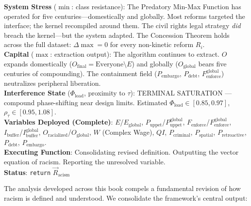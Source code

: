 \begin{tcolorbox}[colback=black!5, colframe=black!70, fonttitle=\bfseries\ttfamily, title=RUNTIME LOG: FINAL OUTPUT]
\ttfamily\small
\textbf{System Stress} ($\min$: class resistance): The Predatory Min-Max Function has operated for five centuries---domestically and globally. Most reforms targeted the interface; the kernel recompiled around them. The civil rights legal strategy \textit{did} breach the kernel---but the system adapted. The Concession Theorem holds across the full dataset: $\Delta\max = 0$ for every non-kinetic reform $R_i$.\\
\textbf{Capital} ($\max$: extraction output): The algorithm continues to extract. $O$ expands domestically ($O_{\text{final}} = \text{Everyone} \setminus E$) and globally ($O_{\text{global}}$ bears five centuries of compounding). The containment field ($P_{\text{embargo}}${,} $P_{\text{debt}}${,} $F_{\text{enforce}}^{\text{global}}$) neutralizes peripheral liberation.\\
\textbf{Interference State} ($\Phi_{\text{load}}$, proximity to $\tau$): TERMINAL SATURATION --- compound phase-shifting near design limits. Estimated $\Phi_{\text{load}} \in [0.85, 0.97]$, $\rho_{\tau} \in [0.95, 1.08]$.\\
\textbf{Variables Deployed (Complete)}: $E$/$E_{\text{global}}${,} $P_{\text{uppet}}$/$P_{\text{uppet}}^{\text{global}}${,} $F_{\text{enforce}}$/$F_{\text{enforce}}^{\text{global}}${,} $I_{\text{buffer}}$/$I_{\text{buffer}}^{\text{global}}${,} $O_{\text{racialized}}$/$O_{\text{global}}${,} $W$ (Complex Wage){,} $QI${,} $P_{\text{criminal}}${,} $P_{\text{spatial}}${,} $P_{\text{retroactive}}${,} $P_{\text{debt}}${,} $P_{\text{embargo}}$.\\
\textbf{Executing Function}: Consolidating revised definition. Outputting the vector equation of racism. Reporting the unresolved variable.\\
\textbf{Status}: \texttt{return} $\vec{R}_{\text{acism}}$
\end{tcolorbox}

\medskip

The analysis developed across this book compels a fundamental revision of how racism is defined and understood. We consolidate the framework's central output:

